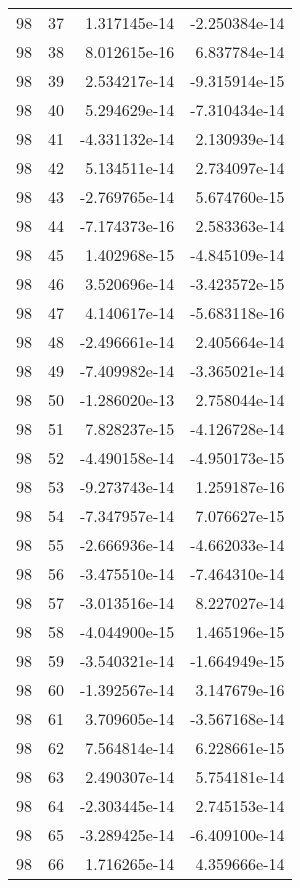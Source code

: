 \begin{tabular}{rrrr}
  98 &   37 &  1.317145e-14 & -2.250384e-14 \\
  98 &   38 &  8.012615e-16 &  6.837784e-14 \\
  98 &   39 &  2.534217e-14 & -9.315914e-15 \\
  98 &   40 &  5.294629e-14 & -7.310434e-14 \\
  98 &   41 & -4.331132e-14 &  2.130939e-14 \\
  98 &   42 &  5.134511e-14 &  2.734097e-14 \\
  98 &   43 & -2.769765e-14 &  5.674760e-15 \\
  98 &   44 & -7.174373e-16 &  2.583363e-14 \\
  98 &   45 &  1.402968e-15 & -4.845109e-14 \\
  98 &   46 &  3.520696e-14 & -3.423572e-15 \\
  98 &   47 &  4.140617e-14 & -5.683118e-16 \\
  98 &   48 & -2.496661e-14 &  2.405664e-14 \\
  98 &   49 & -7.409982e-14 & -3.365021e-14 \\
  98 &   50 & -1.286020e-13 &  2.758044e-14 \\
  98 &   51 &  7.828237e-15 & -4.126728e-14 \\
  98 &   52 & -4.490158e-14 & -4.950173e-15 \\
  98 &   53 & -9.273743e-14 &  1.259187e-16 \\
  98 &   54 & -7.347957e-14 &  7.076627e-15 \\
  98 &   55 & -2.666936e-14 & -4.662033e-14 \\
  98 &   56 & -3.475510e-14 & -7.464310e-14 \\
  98 &   57 & -3.013516e-14 &  8.227027e-14 \\
  98 &   58 & -4.044900e-15 &  1.465196e-15 \\
  98 &   59 & -3.540321e-14 & -1.664949e-15 \\
  98 &   60 & -1.392567e-14 &  3.147679e-16 \\
  98 &   61 &  3.709605e-14 & -3.567168e-14 \\
  98 &   62 &  7.564814e-14 &  6.228661e-15 \\
  98 &   63 &  2.490307e-14 &  5.754181e-14 \\
  98 &   64 & -2.303445e-14 &  2.745153e-14 \\
  98 &   65 & -3.289425e-14 & -6.409100e-14 \\
  98 &   66 &  1.716265e-14 &  4.359666e-14 \\

\end{tabular}
